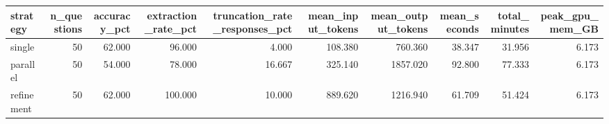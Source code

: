 \begin{tabular}{lrrrrrrrrr}
\toprule
strategy & n\_questions & accuracy\_pct & extraction\_rate\_pct & truncation\_rate\_responses\_pct & mean\_input\_tokens & mean\_output\_tokens & mean\_seconds & total\_minutes & peak\_gpu\_mem\_GB \\
\midrule
single & 50 & 62.000 & 96.000 & 4.000 & 108.380 & 760.360 & 38.347 & 31.956 & 6.173 \\
parallel & 50 & 54.000 & 78.000 & 16.667 & 325.140 & 1857.020 & 92.800 & 77.333 & 6.173 \\
refinement & 50 & 62.000 & 100.000 & 10.000 & 889.620 & 1216.940 & 61.709 & 51.424 & 6.173 \\
\bottomrule
\end{tabular}
